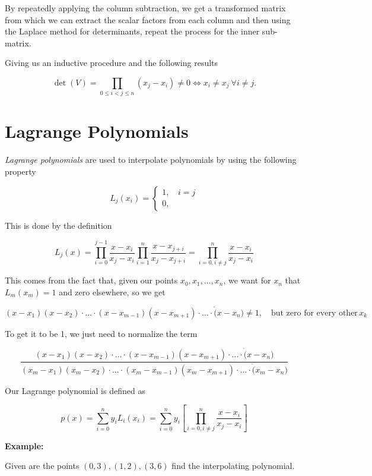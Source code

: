 By repeatedly applying the column subtraction, we get a transformed matrix from which we can extract the scalar factors from each 
column and then using the Laplace method for determinants, repeat the process for the inner sub-matrix.

Giving us an inductive procedure and the following results 

\[
    \det(V) = \prod_{0 \le i < j \le n} (x_j - x_i) \neq 0 \iff x_i \ne x_j \ \forall i \ne j.
\]

\section{Lagrange Polynomials}

\emph{Lagrange polynomials} are used to interpolate polynomials by using the following property

\[
    L_j(x_i) = 
    \begin{cases}
       1, & \, i = j \\  
       0, &  
    \end{cases}
\]

This is done by the definition 

\[
    L_j (x) = \prod_{i = 0}^{j - 1} \frac{x - x_i}{x_j- x_i} \prod_{i = 1}^{n} \frac{x - x_{j + i}}{x_j - x_{j + i}} = \prod_{i = 0, i \ne j}^{n} \frac{x - x_i}{x_j - x_i}
\]

This comes from the fact that, given our points \(x_0, x_1, \dots, x_n\), we want for \(x_n\) that \(L_m(x_m) = 1\) and zero elsewhere, so we get 

\[
    (x - x_1)(x - x_2)\cdot \dots \cdot (x - x_{m - 1})(x - x_{m + 1}) \cdot \dots \cdot \dot (x - x_n) \ne 1, \quad \text{but zero for every other}\, x_k
\]

To get it to be 1, we just need to normalize the term

\[
    \frac{(x - x_1)(x - x_2)\cdot \dots \cdot (x - x_{m - 1})(x - x_{m + 1}) \cdot \dots \cdot \dot (x - x_n)}{(x_m - x_1)(x_m - x_2)\cdot \dots \cdot (x_m - x_{m - 1})(x_m - x_{m + 1}) \cdot \dots \cdot \dot (x_m - x_n)}
\]

Our Lagrange polynomial is defined as 

\[
    p(x) = \sum_{i = 0}^{n} y_i L_i(x_i) = \sum_{i = 0}^{n} y_i  \left[\prod_{i = 0, i \ne j}^{n} \frac{x - x_i}{x_j - x_i}\right]
\]

\textbf{Example:}

Given are the points \((0, 3), (1, 2), (3, 6)\) find the interpolating polynomial.

